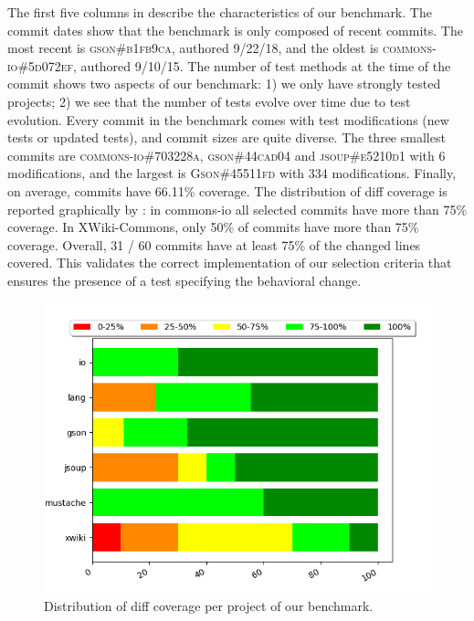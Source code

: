 The first five columns in  describe the characteristics of our benchmark.
The commit dates show that the benchmark is only composed of recent commits.
The most recent is \textsc{gson\#b1fb9ca}, authored 9/22/18, and the oldest is \textsc{commons-io\#5d072ef}, authored 9/10/15.
The number of test methods at the time of the commit shows two aspects of our benchmark:
1) we only have strongly tested projects;
2) we see that the number of tests evolve over time
due to test evolution.
Every commit in the benchmark comes with test modifications (new tests or updated tests), and commit sizes are quite diverse.
The three smallest commits are \textsc{commons-io\#703228a}, \textsc{gson\#44cad04} and \textsc{jsoup\#e5210d1} with 6 modifications, and the largest is \textsc{Gson\#45511fd} with 334 modifications.
%
Finally, 
on average, commits have 66.11\% coverage. 
The distribution of diff coverage is reported graphically by : 
in commons-io all selected commits have more than 75\% coverage.
In XWiki-Commons, only 50\% of commits have more than 75\% coverage. Overall, 31 / 60 commits have at least 75\% of the changed lines covered.
This validates the correct implementation of our selection criteria that ensures the presence of a test specifying the behavioral change.

\begin{figure}
\centering
\includegraphics[width=.95\linewidth]{img/diff_cov_hist.png}
\caption{Distribution of diff coverage per project of our benchmark.}
\label{fig:histdiffcoverage}
\end{figure}

